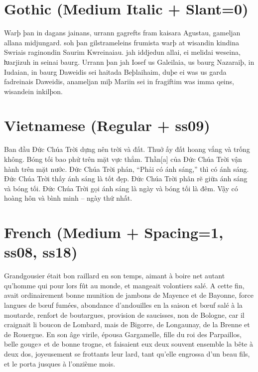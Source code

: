 \documentclass[12pt,letterpaper,openany]{book}
\begin{document}
\section{Gothic (Medium Italic + Slant=0)}

{\italslantedmedium\large Warþ þan in dagans jainans, urrann gagrefts fram kaisara Agustau, gameljan allana midjungard. soh þan gilstrameleins frumista warþ at wisandin kindina Swriais raginondin Saurim Kwreinaiau. jah iddjedun allai, ei melidai weseina, ƕarjizuh in seinai baurg. Urrann þan jah Iosef us Galeilaia, us baurg Nazaraiþ, in Iudaian, in baurg Daweidis sei haitada Beþlaihaim, duþe ei was us garda fadreinais Daweidis, anameljan miþ Mariin sei in fragiftim was imma qeins, wisandein inkilþon.}

\section{Vietnamese (Regular + ss09)}

{Ban đầu Ðức Chúa Trời dựng nên trời và đất. Thuở ấy đất hoang vắng và trống không. Bóng tối bao phử trên mặt vực thẳm. Thần[a] của Ðức Chúa Trời vận hành trên mặt nước. Ðức Chúa Trời phán, “Phải có ánh sáng,” thì có ánh sáng. Ðức Chúa Trời thấy ánh sáng là tốt đẹp. Ðức Chúa Trời phân rẽ giữa ánh sáng và bóng tối. Ðức Chúa Trời gọi ánh sáng là ngày và bóng tối là đêm. Vậy có hoàng hôn và bình minh – ngày thứ nhất.}

\section{French (Medium + Spacing=1, ss08, ss18)}

{\mediumspaced{} Grandgousier était bon raillard en son temps,
aimant à boire net autant qu’homme qui pour lors fût
au monde, et mangeait volontiers salé. A cette fin,
avait ordinairement bonne munition de jambons de Mayence
et de Bayonne, force langues de bœuf fumées, abondance
d’andouilles en la saison et bœuf salé à la moutarde, renfort de
boutargues, provision de saucisses, non de Bologne, car il
craignait li boucon de Lombard, mais de Bigorre, de Longaunay,
de la Brenne et de Rouergue. En son âge virile, épousa
Gargamelle, fille du roi des Parpaillos, belle gouge» et de bonne
trogne, et faisaient eux deux souvent ensemble la bête à deux
dos, joyeusement se frottants leur lard, tant qu’elle engrossa
d’un beau fils, et le porta jusques à l’onzième mois.}
\end{document}
